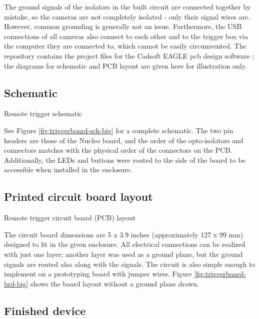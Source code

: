 The ground signals of the isolators in the built circuit are connected together by mistake, so the cameras are not completely isolated - only their signal wires are.
However, common grounding is generally not an issue.
Furthermore, the USB connections of all cameras also connect to each other and to the trigger box via the computer they are connected to, which cannot be easily circumvented.
The repository contains the project files for the Cadsoft EAGLE pcb design software \cite{eaglepcb}; the diagrams for schematic and PCB layout are given here for illustration only.

\subsection{Schematic} \label{app:fullschematic}

{Remote trigger schematic}

See Figure \ref{fig:triggerboard-sch-big} for a complete schematic.
The two pin headers are those of the Nucleo board, and the order of the opto-isolators and connectors matches with the physical order of the connectors on the PCB.
Additionally, the LEDs and buttons were routed to the side of the board to be accessible when installed in the enclosure.

\subsection{Printed circuit board layout}

{Remote trigger circuit board (PCB) layout}

The circuit board dimensions are 5 x 3.9 inches (approximately 127 x 99 mm) designed to fit in the given enclosure.
All electrical connections can be realized with just one layer;
another layer was used as a ground plane, but the ground signals are routed also along with the signals.
The circuit is also simple enough to implement on a prototyping board with jumper wires.
Figure \ref{fig:triggerboard-brd-big} shows the board layout without a ground plane drawn.

\subsection{Finished device}

